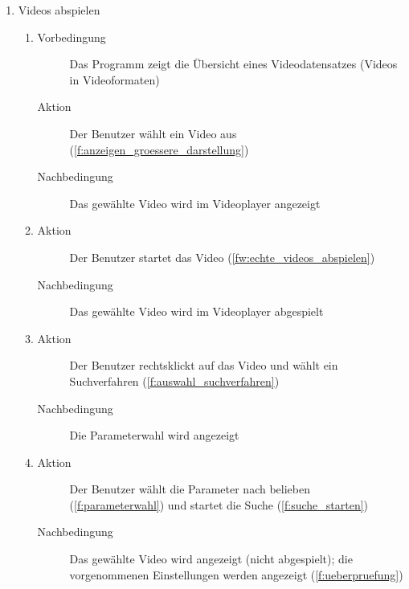\begin{enumerate} [label=\bfseries /TSW \arabic*0/, leftmargin=*]
	\item Videos abspielen
	\begin{enumerate}
		\item
		\begin{description}
			\item[Vorbedingung] Das Programm zeigt die Übersicht eines Videodatensatzes (Videos in Videoformaten)
			\item[Aktion] Der Benutzer wählt ein Video aus (\ref{f:anzeigen_groessere_darstellung})
			\item[Nachbedingung] Das gewählte Video wird im Videoplayer angezeigt
		\end{description}
		\item
		\begin{description}
			\item[Aktion] Der Benutzer startet das Video (\ref{fw:echte_videos_abspielen})
			\item[Nachbedingung] Das gewählte Video wird im Videoplayer abgespielt
		\end{description}
		\item
		\begin{description}
			\item[Aktion] Der Benutzer rechtsklickt auf das Video und wählt ein Suchverfahren (\ref{f:auswahl_suchverfahren})
			\item[Nachbedingung] Die Parameterwahl wird angezeigt
		\end{description}
		\item
		\begin{description}
			\item[Aktion] Der Benutzer wählt die Parameter nach belieben (\ref{f:parameterwahl}) und startet die Suche (\ref{f:suche_starten})
			\item[Nachbedingung] Das gewählte Video wird angezeigt (nicht abgespielt); die vorgenommenen Einstellungen werden angezeigt (\ref{f:ueberpruefung})
		\end{description}
	\end{enumerate}
\end{enumerate}
\pagebreak
